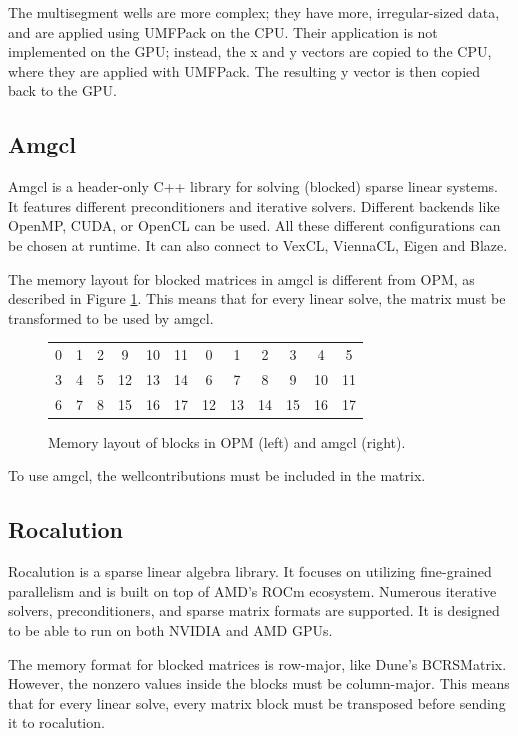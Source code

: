 The multisegment wells are more complex; they have more, irregular-sized data, and are applied using UMFPack\cite{umfpack} on the CPU.
Their application is not implemented on the GPU; instead, the x and y vectors are copied to the CPU, where they are applied with UMFPack.
The resulting y vector is then copied back to the GPU.

\subsection{Amgcl}
Amgcl\cite{amgcl1,amgcl2} is a header-only C++ library for solving (blocked) sparse linear systems.
It features different preconditioners and iterative solvers.
Different backends like OpenMP, CUDA, or OpenCL can be used.
All these different configurations can be chosen at runtime.
It can also connect to VexCL\cite{vexcl}, ViennaCL, Eigen\cite{eigen} and Blaze\cite{blaze}.

The memory layout for blocked matrices in amgcl is different from OPM, as described in Figure \ref{fig:amgcl_layout}.
This means that for every linear solve, the matrix must be transformed to be used by amgcl.

\begin{figure}
\centering
\begin{tabular}{cccccc|cccccc}
0 & 1 & 2 & 9 & 10 & 11     &   0 & 1 & 2 & 3 & 4 & 5 \\
3 & 4 & 5 & 12 & 13 & 14     &  6 & 7 & 8 & 9 & 10 & 11 \\
6 & 7 & 8 & 15 & 16 & 17     &  12 & 13 & 14 & 15 & 16 & 17 \\
\end{tabular}
\caption{Memory layout of blocks in OPM (left) and amgcl (right).}
\label{fig:amgcl_layout}
\end{figure}

To use amgcl, the wellcontributions must be included in the matrix.

\subsection{Rocalution}
Rocalution\cite{rocalution} is a sparse linear algebra library.
It focuses on utilizing fine-grained parallelism and is built on top of AMD's ROCm\cite{rocm} ecosystem.
Numerous iterative solvers, preconditioners, and sparse matrix formats are supported.
It is designed to be able to run on both NVIDIA and AMD GPUs.

The memory format for blocked matrices is row-major, like Dune's BCRSMatrix.
However, the nonzero values inside the blocks must be column-major.
This means that for every linear solve, every matrix block must be transposed before sending it to rocalution.

